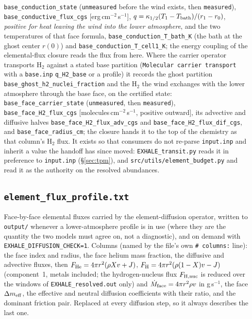 \documentclass[english,a4paper]{my_memo}
\begin{document}
\texttt{base\_conduction\_state} (\texttt{unmeasured} before the wind
exists, then \texttt{measured}), \texttt{base\_conductive\_flux\_cgs}
[erg\,cm$^{-2}$\,s$^{-1}$], $q=\kappa_{1/2}(T_1-T_{\rm bath})/(r_1-r_0)$,
\emph{positive for heat leaving the wind into the lower atmosphere}, and the
two temperatures of that face formula, \texttt{base\_conduction\_T\_bath\_K}
(the bath at the ghost center $r(0)$) and
\texttt{base\_conduction\_T\_cell1\_K}; the energy coupling of the
elemental-flux closure reads the flux from here. Where the carrier operator
transports H$_2$ against a stated base partition (\texttt{Molecular carrier
transport} with a \texttt{base.inp} \texttt{q\_H2\_base} or a profile) it
records the ghost partition \texttt{base\_ghost\_h2\_nuclei\_fraction} and the
H$_2$ the wind exchanges with the lower atmosphere through the base face, on
the certified state: \texttt{base\_face\_carrier\_state}
(\texttt{unmeasured}, then \texttt{measured}),
\texttt{base\_face\_H2\_flux\_cgs} [molecules\,cm$^{-2}$\,s$^{-1}$, positive
outward], its advective and diffusive halves
\texttt{base\_face\_H2\_flux\_adv\_cgs} and
\texttt{base\_face\_H2\_flux\_dif\_cgs}, and
\texttt{base\_face\_radius\_cm}; the closure hands it to the top of the
chemistry as that column's H$_2$ flux. It exists so that consumers do not re-parse
\texttt{input.inp} and inherit a value the handoff has since moved:
\texttt{EXHALE\_transit.py} reads it in preference to \texttt{input.inp}
(\S\ref{sec:tpm}), and \texttt{src/utils/element\_budget.py} and
 read it as the authority on the
resolved abundances.

\subsection{\texttt{element\_flux\_profile.txt}}
Face-by-face elemental fluxes carried by the element-diffusion operator,
written to \texttt{output/} whenever a lower-atmosphere profile is in use
(where they are the quantity the two models must agree on, not a diagnostic),
and on demand with \texttt{EXHALE\_DIFFUSION\_CHECK=1}. Columns (named by the
file's own \texttt{\# columns:} line): the face index and radius, the face
helium mass fraction, the diffusive and advective fluxes, then
$F_{\rm He}=4\pi r^2(\rho X v + J)$, $F_{\rm H}=4\pi r^2(\rho(1-X)v-J)$
(component~1, metals included; the hydrogen-nucleus flux $F_{\rm H,nuc}$ is
reduced over the windows of \texttt{EXHALE\_resolved.out} only) and
$\dot M_{\rm face}=4\pi r^2\rho v$ in g\,s$^{-1}$, the face
$\Delta m_{\rm eff}$, the effective and neutral diffusion coefficients with
their ratio, and the dominant friction pair. Replaced at every diffusion step,
so it always describes the last one.
\end{document}
